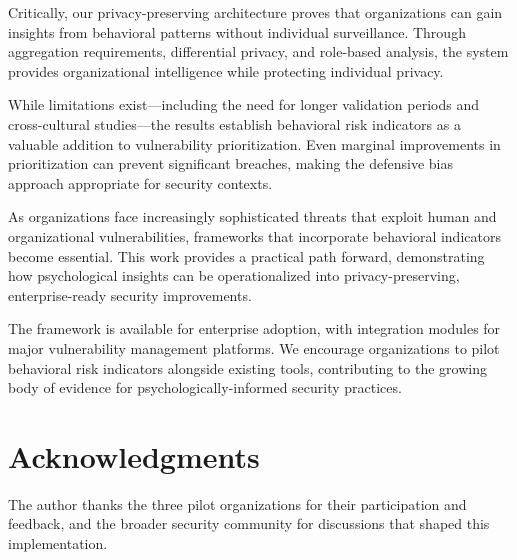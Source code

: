 \documentclass[11pt,a4paper]{article}
\begin{document}
Critically, our privacy-preserving architecture proves that organizations can gain insights from behavioral patterns without individual surveillance. Through aggregation requirements, differential privacy, and role-based analysis, the system provides organizational intelligence while protecting individual privacy.

While limitations exist—including the need for longer validation periods and cross-cultural studies—the results establish behavioral risk indicators as a valuable addition to vulnerability prioritization. Even marginal improvements in prioritization can prevent significant breaches, making the defensive bias approach appropriate for security contexts.

As organizations face increasingly sophisticated threats that exploit human and organizational vulnerabilities, frameworks that incorporate behavioral indicators become essential. This work provides a practical path forward, demonstrating how psychological insights can be operationalized into privacy-preserving, enterprise-ready security improvements.

The framework is available for enterprise adoption, with integration modules for major vulnerability management platforms. We encourage organizations to pilot behavioral risk indicators alongside existing tools, contributing to the growing body of evidence for psychologically-informed security practices.

\section*{Acknowledgments}

The author thanks the three pilot organizations for their participation and feedback, and the broader security community for discussions that shaped this implementation.
\end{document}

